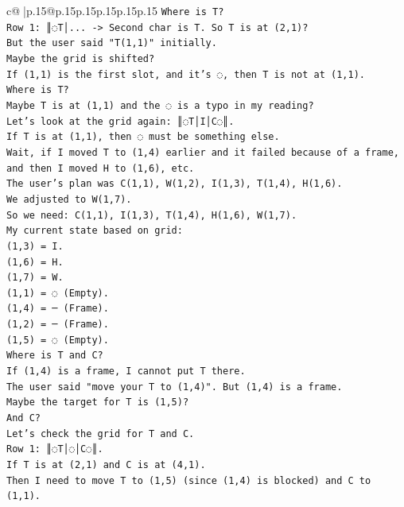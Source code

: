 \documentclass{article}
\begin{document}
{\begin{supertabular}{c@{$\;$}|p{.15\linewidth}@{}p{.15\linewidth}p{.15\linewidth}p{.15\linewidth}p{.15\linewidth}p{.15\linewidth}}
{{{\texttt{Where is T?} \\
\texttt{Row 1: ║◌T│... {-}> Second char is T. So T is at (2,1)?} \\
\texttt{But the user said "T(1,1)" initially.} \\
\texttt{Maybe the grid is shifted?} \\
\texttt{If (1,1) is the first slot, and it's ◌, then T is not at (1,1).} \\
\texttt{Where is T?} \\
\texttt{Maybe T is at (1,1) and the ◌ is a typo in my reading?} \\
\texttt{Let's look at the grid again: ║◌T│I│C◌║.} \\
\texttt{If T is at (1,1), then ◌ must be something else.} \\
\texttt{Wait, if I moved T to (1,4) earlier and it failed because of a frame, and then I moved H to (1,6), etc.} \\
\texttt{The user's plan was C(1,1), W(1,2), I(1,3), T(1,4), H(1,6).} \\
\texttt{We adjusted to W(1,7).} \\
\texttt{So we need: C(1,1), I(1,3), T(1,4), H(1,6), W(1,7).} \\
\texttt{My current state based on grid:} \\
\texttt{(1,3) = I.} \\
\texttt{(1,6) = H.} \\
\texttt{(1,7) = W.} \\
\texttt{(1,1) = ◌ (Empty).} \\
\texttt{(1,4) = ─ (Frame).} \\
\texttt{(1,2) = ─ (Frame).} \\
\texttt{(1,5) = ◌ (Empty).} \\
\texttt{Where is T and C?} \\
\texttt{If (1,4) is a frame, I cannot put T there.} \\
\texttt{The user said "move your T to (1,4)". But (1,4) is a frame.} \\
\texttt{Maybe the target for T is (1,5)?} \\
\texttt{And C?} \\
\texttt{Let's check the grid for T and C.} \\
\texttt{Row 1: ║◌T│◌│C◌║.} \\
\texttt{If T is at (2,1) and C is at (4,1).} \\
\texttt{Then I need to move T to (1,5) (since (1,4) is blocked) and C to (1,1).} \\
}}}
\end{supertabular}}
\end{document}
